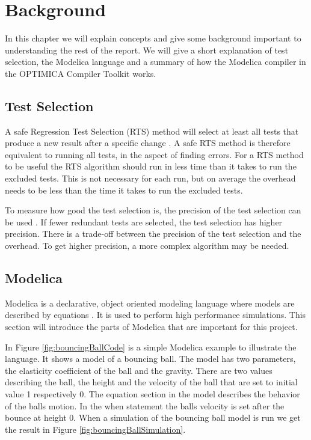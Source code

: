 \documentclass{cslthse-msc}
\begin{document}
\chapter[Background]{Background}
In this chapter we will explain concepts and give some background important to understanding the rest of the report. We will give a short explanation of test selection, the Modelica language and a summary of how the Modelica compiler in the OPTIMICA Compiler Toolkit works.

\section{Test Selection}
A safe Regression Test Selection (RTS) method will select at least all tests that produce a new result after a specific change \cite{DBLP:conf/pppj/OqvistHM16}. A safe RTS method is therefore equivalent to running all tests, in the aspect of finding errors. For a RTS method to be useful the RTS algorithm should run in less time than it takes to run the excluded tests. This is not necessary for each run, but on average the overhead needs to be less than the time it takes to run the excluded tests.

To measure how good the test selection is, the precision of the test selection can be used \cite{DBLP:conf/sigsoft/LegunsenHSLZM16}. If fewer redundant tests are selected, the test selection has higher precision. There is a trade-off between the precision of the test selection and the overhead. To get higher precision, a more complex algorithm may be needed.

\section{Modelica}
Modelica is a declarative, object oriented modeling language where models are described by equations \cite{modelicamodelica}. It is used to perform high performance simulations. This section will introduce the parts of Modelica that are important for this project.

In Figure \ref{fig:bouncingBallCode} is a simple Modelica example to illustrate the language. It shows a model of a bouncing ball. The model has two parameters, the elasticity coefficient of the ball and the gravity. There are two values describing the ball, the height and the velocity of the ball that are set to initial value 1 respectively 0. The equation section in the model describes the behavior of the balls motion. In the when statement the balls velocity is set after the bounce at height 0. When a simulation of the bouncing ball model is run we get the result in Figure \ref{fig:bouncingBallSimulation}.
\end{document}
